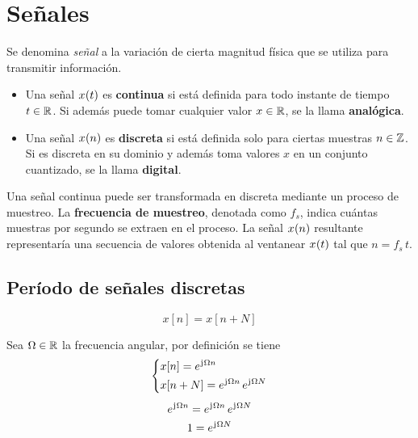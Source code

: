 \chapter{Señales}

Se denomina \emph{señal} a la variación de cierta magnitud física que se utiliza para transmitir información.

\begin{itemize}
    \item
    Una señal $\fx[x]{t}$ es \textbf{continua} si está definida para todo instante de tiempo $t \in \setR$.
    Si además puede tomar cualquier valor $x \in \setR$, se la llama \textbf{analógica}.

    \item
    Una señal $\fx[x]{n}$ es \textbf{discreta} si está definida solo para ciertas muestras $n \in \setZ$.
    Si es discreta en su dominio y además toma valores $x$ en un conjunto cuantizado, se la llama \textbf{digital}.
\end{itemize}

Una señal continua puede ser transformada en discreta mediante un proceso de muestreo.
La \textbf{frecuencia de muestreo}, denotada como $f_s$, indica cuántas muestras por segundo se extraen en el proceso.
La señal $\fx[x]{n}$ resultante representaría una secuencia de valores obtenida al ventanear $\fx[x]{t}$ tal que $n = f_s \, t$.

\section{Período de señales discretas}

\begin{mdframed}[style=PropertyFrame]
    \begin{defn}
        \label{defn:funcDiscPeriod}
    \end{defn}
    \begin{equation*}
        x[n] = x[n+N]
    \end{equation*}
\end{mdframed}

Sea $\Omega \in \setR$ la frecuencia angular, por definición se tiene
\begin{gather*}
    \left\{
    \begin{aligned}
        & x[n] = e^{\iu \Omega n}
        \\
        & x[n+N] = e^{\iu \Omega n} \, e^{\iu \Omega N}
    \end{aligned}
    \right.
    \\[1ex]
    e^{\iu \Omega n} = e^{\iu \Omega n} \, e^{\iu \Omega N}
    \\
    1 = e^{\iu \Omega N}
\end{gather*}

